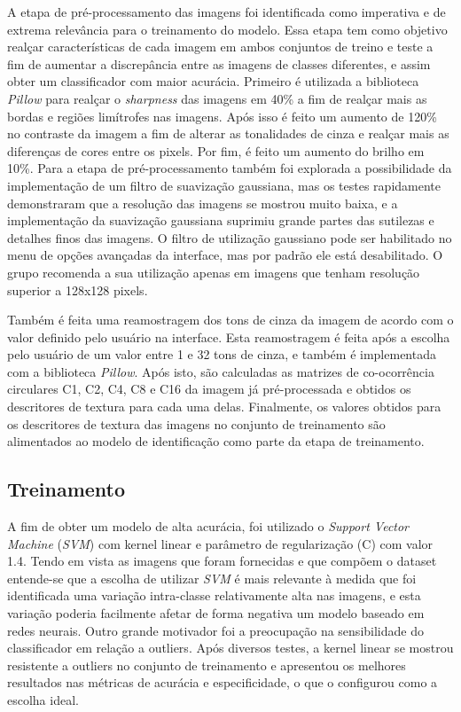 A etapa de pré-processamento das imagens foi identificada como imperativa e de 
extrema relevância para o treinamento do modelo. Essa etapa tem como objetivo 
realçar características de cada imagem em ambos conjuntos de treino e teste a 
fim de aumentar a discrepância entre as imagens de classes diferentes,  e assim 
obter um classificador com maior acurácia. Primeiro é utilizada a biblioteca 
\emph{Pillow} para realçar o \emph{sharpness} das imagens em 40\% a fim de realçar mais as 
bordas e regiões limítrofes nas imagens. Após isso é feito um aumento de 120\% 
no contraste da imagem a fim de alterar as tonalidades de cinza e realçar mais 
as diferenças de cores entre os pixels. Por fim, é feito um aumento do brilho em 10\%. 
Para a etapa de pré-processamento também foi explorada a possibilidade da 
implementação de um filtro de suavização gaussiana, mas os testes rapidamente 
demonstraram que a resolução das imagens se mostrou muito baixa, e a implementação 
da suavização gaussiana suprimiu grande partes das sutilezas e detalhes finos das imagens.
O filtro de utilização gaussiano pode ser habilitado no menu de opções avançadas da
interface, mas por padrão ele está desabilitado. O grupo recomenda a sua utilização
apenas em imagens que tenham resolução superior a 128x128 pixels. 

Também é feita uma reamostragem dos tons de cinza da imagem de acordo com o valor 
definido pelo usuário na interface. Esta reamostragem é feita após a escolha pelo 
usuário de um valor entre 1 e 32 tons de cinza, e também é implementada com a biblioteca 
\emph{Pillow}. Após isto, são calculadas as matrizes de co-ocorrência circulares C1, C2, C4, C8 e C16 
da imagem já pré-processada e obtidos os descritores de textura para cada uma delas. 
Finalmente, os valores obtidos para os descritores de textura das imagens no conjunto 
de treinamento são alimentados ao modelo de identificação como parte da etapa de treinamento.

\subsection{Treinamento}

A fim de obter um modelo de alta acurácia, foi utilizado o \emph{Support Vector Machine} (\emph{SVM}) 
com kernel linear e parâmetro de regularização (C) com valor 1.4. Tendo em vista as imagens 
que foram fornecidas e que compõem o dataset entende-se que a escolha de utilizar \emph{SVM} é 
mais relevante à medida que foi identificada uma variação intra-classe relativamente alta 
nas imagens, e esta variação poderia facilmente afetar de forma negativa um modelo baseado 
em redes neurais. Outro grande motivador foi a preocupação na sensibilidade do classificador
em relação a outliers. Após diversos testes, a kernel linear se mostrou resistente a 
outliers no conjunto de treinamento e apresentou os melhores resultados nas métricas de 
acurácia e especificidade, o que o configurou como a escolha ideal.

